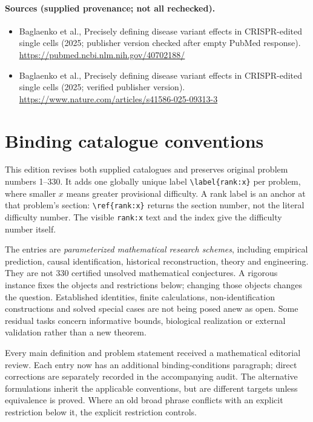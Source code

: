 \documentclass[11pt]{article}
\begin{document}
\paragraph{Sources (supplied provenance; not all rechecked).}
\begin{itemize}
\item Baglaenko et al., Precisely defining disease variant effects in CRISPR-edited single cells (2025; publisher version checked after empty PubMed response). \url{https://pubmed.ncbi.nlm.nih.gov/40702188/}
\item Baglaenko et al., Precisely defining disease variant effects in CRISPR-edited single cells (2025; verified publisher version). \url{https://www.nature.com/articles/s41586-025-09313-3}
\end{itemize}


\section*{Binding catalogue conventions}
This edition revises both supplied catalogues and preserves original problem numbers 1--330. It adds one globally unique label \verb|\label{rank:x}| per problem, where smaller $x$ means greater provisional difficulty. A rank label is an anchor at that problem's section: \verb|\ref{rank:x}| returns the section number, not the literal difficulty number. The visible \texttt{rank:x} text and the index give the difficulty number itself.

The entries are \emph{parameterized mathematical research schemes}, including empirical prediction, causal identification, historical reconstruction, theory and engineering. They are not 330 certified unsolved mathematical conjectures. A rigorous instance fixes the objects and restrictions below; changing those objects changes the question. Established identities, finite calculations, non-identification constructions and solved special cases are not being posed anew as open. Some residual tasks concern informative bounds, biological realization or external validation rather than a new theorem.

Every main definition and problem statement received a mathematical editorial review. Each entry now has an additional binding-conditions paragraph; direct corrections are separately recorded in the accompanying audit. The alternative formulations inherit the applicable conventions, but are different targets unless equivalence is proved. Where an old broad phrase conflicts with an explicit restriction below it, the explicit restriction controls.
\end{document}
